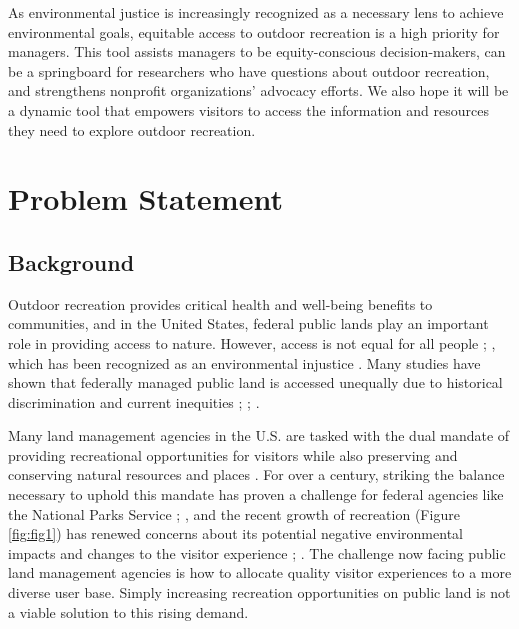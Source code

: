 \documentclass[
  11 pt,
  openany]{book}
\begin{document}
As environmental justice is increasingly recognized as a necessary lens to achieve environmental goals, equitable access to outdoor recreation is a high priority for managers. This tool assists managers to be equity-conscious decision-makers, can be a springboard for researchers who have questions about outdoor recreation, and strengthens nonprofit organizations' advocacy efforts. We also hope it will be a dynamic tool that empowers visitors to access the information and resources they need to explore outdoor recreation.

\hypertarget{problem-statement}{%
\chapter{Problem Statement}\label{problem-statement}}

\hypertarget{background}{%
\section{Background}\label{background}}

Outdoor recreation provides critical health and well-being benefits to communities, and in the United States, federal public lands play an important role in providing access to nature. However, access is not equal for all people \citep{Ewert1990}; \citep{Flores2018}, which has been recognized as an environmental injustice \citep{Floyd2002}. Many studies have shown that federally managed public land is accessed unequally due to historical discrimination and current inequities \citep{Floyd2002}; \citep{Shelby1989}; \citep{Xiao2021}.

Many land management agencies in the U.S. are tasked with the dual mandate of providing recreational opportunities for visitors while also preserving and conserving natural resources and places \citep{Shartaj2020}. For over a century, striking the balance necessary to uphold this mandate has proven a challenge for federal agencies like the National Parks Service \citep{Meinecke1937}; \citep{Sax1980}, and the recent growth of recreation (Figure \ref{fig:fig1}) has renewed concerns about its potential negative environmental impacts and changes to the visitor experience \citep{Hammitt2015}; \citep{Timmons2019}. The challenge now facing public land management agencies is how to allocate quality visitor experiences to a more diverse user base. Simply increasing recreation opportunities on public land is not a viable solution to this rising demand.
\end{document}
